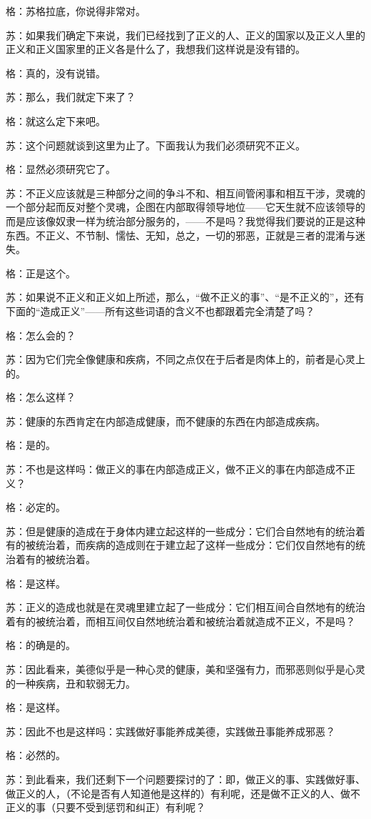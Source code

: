 \documentclass[12pt,oneside]{book}
\begin{document}
格：苏格拉底，你说得非常对。

苏：如果我们确定下来说，我们已经找到了正义的人、正义的国家以及正义人里的正义和正义国家里的正义各是什么了，我想我们这样说是没有错的。

格：真的，没有说错。

苏：那么，我们就定下来了？

格：就这么定下来吧。

苏：这个问题就谈到这里为止了。下面我认为我们必须研究不正义。

格：显然必须研究它了。

苏：不正义应该就是三种部分之间的争斗不和、相互间管闲事和相互干涉，灵魂的一个部分起而反对整个灵魂，企图在内部取得领导地位——它天生就不应该领导的而是应该像奴隶一样为统治部分服务的，——不是吗？我觉得我们要说的正是这种东西。不正义、不节制、懦怯、无知，总之，一切的邪恶，正就是三者的混淆与迷失。

格：正是这个。

苏：如果说不正义和正义如上所述，那么，“做不正义的事”、“是不正义的”，还有下面的“造成正义”——所有这些词语的含义不也都跟着完全清楚了吗？

格：怎么会的？

苏：因为它们完全像健康和疾病，不同之点仅在于后者是肉体上的，前者是心灵上的。

格：怎么这样？

苏：健康的东西肯定在内部造成健康，而不健康的东西在内部造成疾病。

格：是的。

苏：不也是这样吗：做正义的事在内部造成正义，做不正义的事在内部造成不正义？

格：必定的。

苏：但是健康的造成在于身体内建立起这样的一些成分：它们合自然地有的统治着有的被统治着，而疾病的造成则在于建立起了这样一些成分：它们仅自然地有的统治着有的被统治着。

格：是这样。

苏：正义的造成也就是在灵魂里建立起了一些成分：它们相互间合自然地有的统治着有的被统治着，而相互间仅自然地统治着和被统治着就造成不正义，不是吗？

格：的确是的。

苏：因此看来，美德似乎是一种心灵的健康，美和坚强有力，而邪恶则似乎是心灵的一种疾病，丑和软弱无力。

格：是这样。

苏：因此不也是这样吗：实践做好事能养成美德，实践做丑事能养成邪恶？

格：必然的。

苏：到此看来，我们还剩下一个问题要探讨的了：即，做正义的事、实践做好事、做正义的人，（不论是否有人知道他是这样的）有利呢，还是做不正义的人、做不正义的事（只要不受到惩罚和纠正）有利呢？
\end{document}
